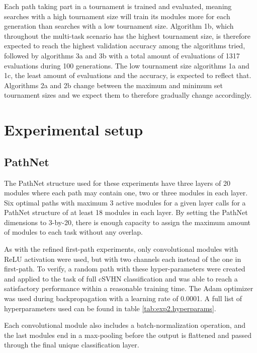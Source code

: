 Each path taking part in a tournament is trained and evaluated, meaning searches with a high tournament size will train its modules more for each generation than searches with a low tournament size. Algorithm 1b, which throughout the multi-task scenario has the highest tournament size, is therefore expected to reach the highest validation accuracy among the algorithms tried, followed by algorithms 3a and 3b with a total amount of evaluations of 1317 evaluations during 100 generations. The low tournament size algorithms 1a and 1c, the least amount of evaluations and the accuracy, is expected to reflect that. Algorithms 2a and 2b change between the maximum and minimum set tournament sizes and we expect them to therefore gradually change accordingly.

\section{Experimental setup}
\label{exp2:implementation}

\subsection{PathNet}
The PathNet structure used for these experiments have three layers of 20 modules where each path may contain one, two or three modules in each layer. Six optimal paths with maximum 3 active modules for a given layer calls for a PathNet structure of at least 18 modules in each layer. By setting the PathNet dimensions to 3-by-20, there is enough capacity to assign the maximum amount of modules to each task without any overlap.



As with the refined first-path experiments, only convolutional modules with ReLU activation were used, but with two channels each instead of the one in first-path. To verify, a random path with these hyper-parameters were created and applied to the task of full cSVHN classification and was able to reach a satisfactory performance within a reasonable training time. The Adam optimizer was used during backpropagation with a learning rate of 0.0001. A full list of hyperparameters used can be found in table \ref{tab:exp2.hyperparams}. 

Each convolutional module also includes a batch-normalization operation, and the last modules end in a max-pooling before the output is flattened and passed through the final unique classification layer. 

